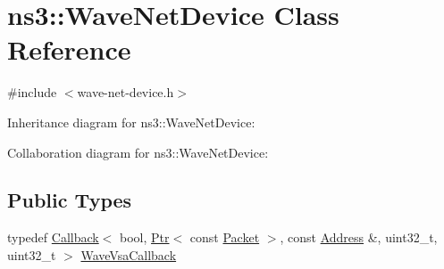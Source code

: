 \hypertarget{classns3_1_1WaveNetDevice}{}\section{ns3\+:\+:Wave\+Net\+Device Class Reference}
\label{classns3_1_1WaveNetDevice}


{\ttfamily \#include $<$wave-\/net-\/device.\+h$>$}



Inheritance diagram for ns3\+:\+:Wave\+Net\+Device\+:


Collaboration diagram for ns3\+:\+:Wave\+Net\+Device\+:
\subsection*{Public Types}
\begin{DoxyCompactItemize}
\item 
typedef \hyperlink{classns3_1_1Callback}{Callback}$<$ bool, \hyperlink{classns3_1_1Ptr}{Ptr}$<$ const \hyperlink{classns3_1_1Packet}{Packet} $>$, const \hyperlink{classns3_1_1Address}{Address} \&, uint32\+\_\+t, uint32\+\_\+t $>$ \hyperlink{classns3_1_1WaveNetDevice_aa5c0bdf5b0cb42fbd142d42a755321df}{Wave\+Vsa\+Callback}
\end{DoxyCompactItemize}
